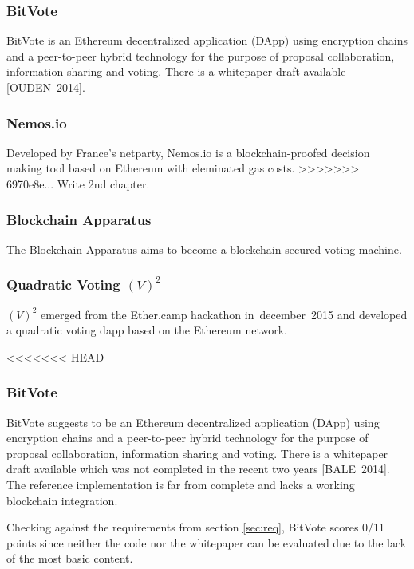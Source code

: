 \documentclass[9pt,oneside]{amsart}
\begin{document}
\begin{multicols}{2}
\subsubsection{BitVote}
BitVote is an Ethereum decentralized application (DApp) using encryption chains and a peer-to-peer hybrid technology for the purpose of proposal collaboration, information sharing and voting. There is a whitepaper draft available [OUDEN~2014].

\subsubsection{Nemos.io}
Developed by France's netparty, Nemos.io is a blockchain-proofed decision making tool based on Ethereum with eleminated gas costs.
>>>>>>> 6970e8e... Write 2nd chapter.

\subsubsection{Blockchain Apparatus}
The Blockchain Apparatus aims to become a blockchain-secured voting machine.

\subsubsection{Quadratic Voting $(V)^2$}
$(V)^2$ emerged from the Ether.camp hackathon in~december~2015 and developed a quadratic voting dapp based on the Ethereum network.

<<<<<<< HEAD

\subsubsection{BitVote}
BitVote suggests to be an Ethereum decentralized application (DApp) using encryption chains and a peer-to-peer hybrid technology for the purpose of proposal collaboration, information sharing and voting. There is a whitepaper draft available which was not completed in the recent two years [BALE~2014]. The reference implementation is far from complete and lacks a working blockchain integration.\par
Checking against the requirements from section \ref{sec:req}, BitVote scores 0/11 points since neither the code nor the whitepaper can be evaluated due to the lack of the most basic content.



\end{multicols}
\end{document}

